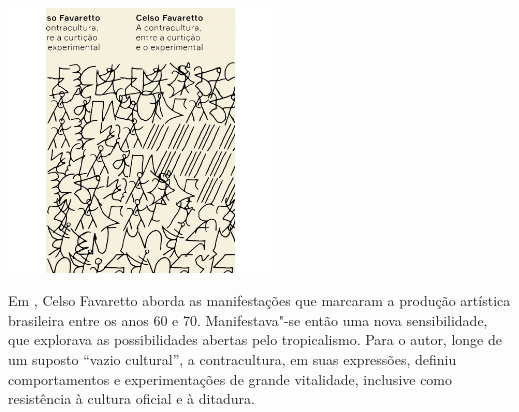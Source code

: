 \begin{center}
\hspace*{-3cm}
\hspace*{3cm}\includegraphics[width=70mm]{./grid/favaretto.jpeg}
\end{center}

\hspace*{-7cm}\hrulefill\hspace*{-7cm}

\medskip

\noindent{}Em {}, Celso Favaretto aborda as manifestações que marcaram a produção artística brasileira entre os anos 60 e 70. Manifestava"-se então uma nova sensibilidade, que explorava as possibilidades abertas pelo tropicalismo. Para o autor, longe de um suposto “vazio cultural”, a contracultura, em suas expressões, definiu comportamentos e experimentações de grande vitalidade, inclusive como resistência à cultura oficial e à ditadura.

\vfill

\hspace*{-.4cm}\begin{minipage}[c]{1\linewidth}
\small{
{}}
\end{minipage}

\pagebreak
\pagestyle{hedracat}

